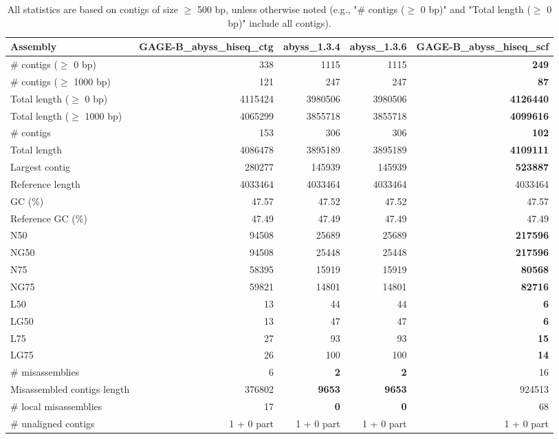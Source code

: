 \documentclass[12pt,a4paper]{article}
\begin{document}
\begin{table}[ht]
\begin{center}
\caption{All statistics are based on contigs of size $\geq$ 500 bp, unless otherwise noted (e.g., "\# contigs ($\geq$ 0 bp)" and "Total length ($\geq$ 0 bp)" include all contigs).}
\begin{tabular}{|l*{4}{|r}|}
\hline
Assembly & GAGE-B\_abyss\_hiseq\_ctg & abyss\_1.3.4 & abyss\_1.3.6 & GAGE-B\_abyss\_hiseq\_scf \\ \hline
\# contigs ($\geq$ 0 bp) & 338 & 1115 & 1115 & {\bf 249} \\ \hline
\# contigs ($\geq$ 1000 bp) & 121 & 247 & 247 & {\bf 87} \\ \hline
Total length ($\geq$ 0 bp) & 4115424 & 3980506 & 3980506 & {\bf 4126440} \\ \hline
Total length ($\geq$ 1000 bp) & 4065299 & 3855718 & 3855718 & {\bf 4099616} \\ \hline
\# contigs & 153 & 306 & 306 & {\bf 102} \\ \hline
Total length & 4086478 & 3895189 & 3895189 & {\bf 4109111} \\ \hline
Largest contig & 280277 & 145939 & 145939 & {\bf 523887} \\ \hline
Reference length & 4033464 & 4033464 & 4033464 & 4033464 \\ \hline
GC (\%) & 47.57 & 47.52 & 47.52 & 47.57 \\ \hline
Reference GC (\%) & 47.49 & 47.49 & 47.49 & 47.49 \\ \hline
N50 & 94508 & 25689 & 25689 & {\bf 217596} \\ \hline
NG50 & 94508 & 25448 & 25448 & {\bf 217596} \\ \hline
N75 & 58395 & 15919 & 15919 & {\bf 80568} \\ \hline
NG75 & 59821 & 14801 & 14801 & {\bf 82716} \\ \hline
L50 & 13 & 44 & 44 & {\bf 6} \\ \hline
LG50 & 13 & 47 & 47 & {\bf 6} \\ \hline
L75 & 27 & 93 & 93 & {\bf 15} \\ \hline
LG75 & 26 & 100 & 100 & {\bf 14} \\ \hline
\# misassemblies & 6 & {\bf 2} & {\bf 2} & 16 \\ \hline
Misassembled contigs length & 376802 & {\bf 9653} & {\bf 9653} & 924513 \\ \hline
\# local misassemblies & 17 & {\bf 0} & {\bf 0} & 68 \\ \hline
\# unaligned contigs & 1 + 0 part & 1 + 0 part & 1 + 0 part & 1 + 0 part \\ \hline

\end{tabular}
\end{center}
\end{table}
\end{document}
